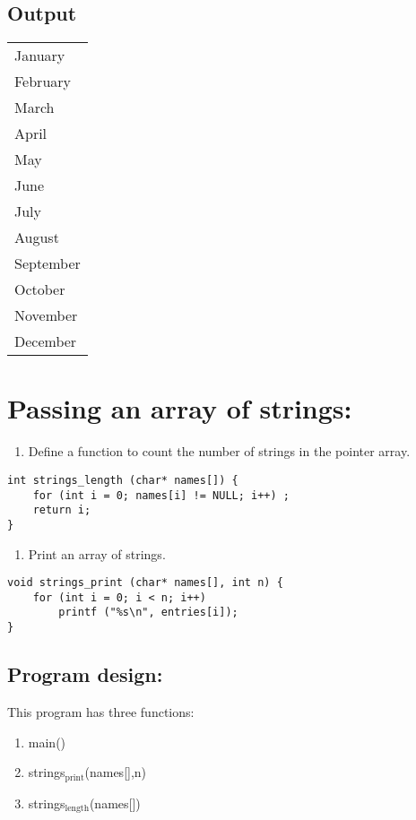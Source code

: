 \documentclass[11pt]{article}
\begin{document}
\subsection*{Output}
\label{sec-1-3}
\begin{center}
\begin{tabular}{l}
January\\
February\\
March\\
April\\
May\\
June\\
July\\
August\\
September\\
October\\
November\\
December\\
\end{tabular}
\end{center}

\section{Passing an array of strings:}
\label{sec-2}
\begin{enumerate}
\item Define a function to count the number of strings in the pointer array.
\end{enumerate}
\begin{verbatim}
int strings_length (char* names[]) {
    for (int i = 0; names[i] != NULL; i++) ;
    return i; 
}
\end{verbatim}
\begin{enumerate}
\item Print an array of strings.
\end{enumerate}
\begin{verbatim}
void strings_print (char* names[], int n) { 
    for (int i = 0; i < n; i++)
        printf ("%s\n", entries[i]);
}
\end{verbatim}

\subsection*{Program design:}
\label{sec-2-1}
This program has three functions:
\begin{enumerate}
\item main()
\item strings$_{\text{print}}$(names[],n)
\item strings$_{\text{length}}$(names[])
\end{enumerate}
\end{document}
